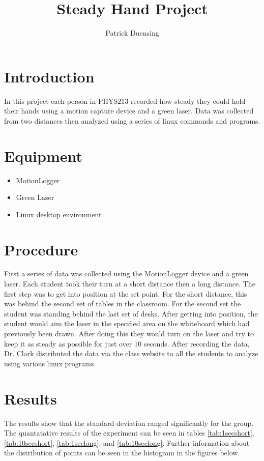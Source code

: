 \documentclass[10pt,letterpaper]{article}
\author{Patrick Duensing}
\title{Steady Hand Project}
\begin{document}
\maketitle
\section{Introduction}
	In this project each person in PHYS213 recorded how steady they could hold their hands using a motion capture device and a green laser. Data was collected from two distances then analyzed using a series of linux commands and programs.
\section{Equipment}
\begin{itemize}
\item MotionLogger
\item Green Laser
\item Linux desktop environment
\end{itemize}
\section{Procedure}
	First a series of data was collected using the MotionLogger device and a green laser. Each student took their turn at a short distance then a long distance. The first step was to get into position at the set point. For the short distance, this was behind the second set of tables in the classroom. For the second set the student was standing behind the last set of desks. After getting into position, the student would aim the laser in the specified area on the whiteboard which had previously been drawn. After doing this they would turn on the laser and try to keep it as steady as possible for just over 10 seconds. After recording the data, Dr. Clark distributed the data via the class website to all the students to analyze using various linux programs.
\section{Results}
	The results show that the standard deviation ranged significantly for the group. The quantatative results of the experiment can be seen in tables \ref{tab:1secshort}, \ref{tab:10secshort}, \ref{tab:1seclong}, and \ref{tab:10seclong}. Further information about the distribution of points can be seen in the histogram in the figures below.
\end{document}
